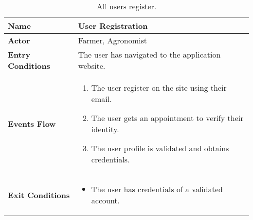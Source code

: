 
\begin{table}[hbt!]
\centering
\small
\caption{\label{tab:userUseReg}All users register.}

\renewcommand{\arraystretch}{1.25}
\begin{tabular}{|l|>{\raggedright\arraybackslash}m{12cm}|}
    \hline
    \textbf{Name} & User Registration\\
    \hline
   	\textbf{Actor} & Farmer, Agronomist\\
    \hline
    \textbf{Entry Conditions} & The user has navigated to the application website.\\
    \hline
    
    \textbf{Events Flow} & \begin{enumerate}
    			\item The user register on the site using their email.
    			\item The user gets an appointment to verify their identity.
    			\item The user profile is validated and obtains credentials.
	    		\end{enumerate}
    	\\
    \hline
    \textbf{Exit Conditions} & \begin{itemize}
    	\item The user has credentials of a validated account.
   		\end{itemize} \\
    \hline
\end{tabular}
\end{table}